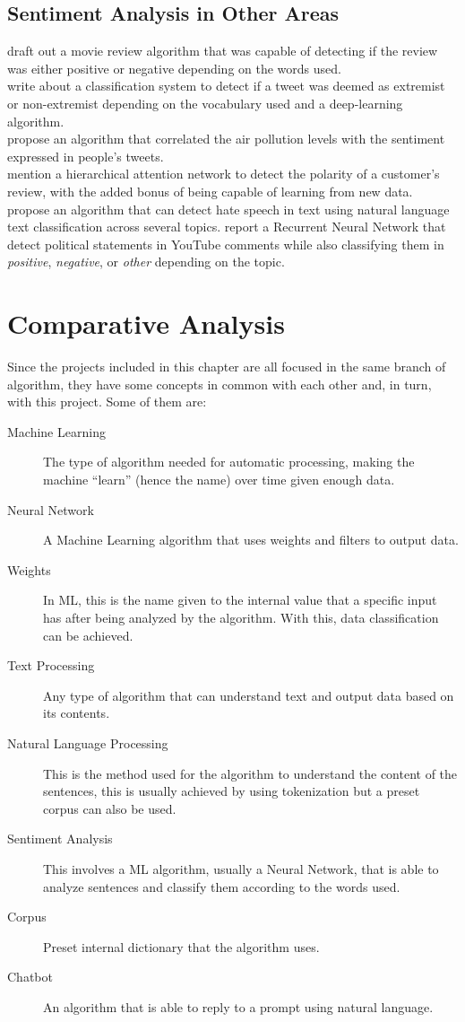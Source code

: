 \subsection{Sentiment Analysis in Other Areas}
\citet{rf5} draft out a movie review algorithm that was capable of detecting if the review was either positive or negative depending on the words used.\\
\citet{rf11} write about a classification system to detect if a tweet was deemed as extremist or non-extremist depending on the vocabulary used and a deep-learning algorithm.\\
\citet{rf12} propose an algorithm that correlated the air pollution levels with the sentiment expressed in people's tweets.\\
\citet{rf13} mention a hierarchical attention network to detect the polarity of a customer's review, with the added bonus of being capable of learning from new data.
\citet{rf15} propose an algorithm that can detect hate speech in text using natural language text classification across several topics.
\citet{rf16} report a Recurrent Neural Network that detect political statements in YouTube comments while also classifying them in \textit{positive}, \textit{negative}, or \textit{other} depending on the topic.

\section{Comparative Analysis}
Since the projects included in this chapter are all focused in the same branch of algorithm, they have some concepts in common with each other and, in turn, with this project. Some of them are:
\begin{description}
	\item[Machine Learning]{The type of algorithm needed for automatic processing, making the machine ``learn'' (hence the name) over time given enough data.}
	\item[Neural Network]{A Machine Learning algorithm that uses weights and filters to output data.}
	\item[Weights]{In ML, this is the name given to the internal value that a specific input has after being analyzed by the algorithm. With this, data classification can be achieved.}
	\item[Text Processing]{Any type of algorithm that can understand text and output data based on its contents.}
	\item[Natural Language Processing]{This is the method used for the algorithm to understand the content of the sentences, this is usually achieved by using tokenization but a preset corpus can also be used.}	
	\item[Sentiment Analysis]{This involves a ML algorithm, usually a Neural Network, that is able to analyze sentences and classify them according to the words used.}
	\item[Corpus]{Preset internal dictionary that the algorithm uses.}
	\item[Chatbot]{An algorithm that is able to reply to a prompt using natural language.}
\end{description}


